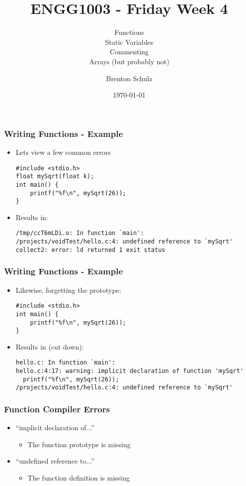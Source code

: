 \documentclass[14pt]{beamer}
\title{ENGG1003 - Friday Week 4}
\subtitle{Functions\\Static Variables\\Commenting\\Arrays (but probably not)}
\author{Brenton Schulz}
\institute{University of Newcastle}
\date{\today}
\begin{document}
\titlepage

\begin{frame}[fragile]
\frametitle{Writing Functions - Example}

\begin{itemize}
\item Lets view a few common errors
\begin{lstlisting}[style=CStyle]
#include <stdio.h>
float mySqrt(float k);
int main() {
	printf("%f\n", mySqrt(26));
}
\end{lstlisting}
\item Results in:
\begin{lstlisting}[style=pseudo]
/tmp/ccT6mLDi.o: In function `main':
/projects/voidTest/hello.c:4: undefined reference to `mySqrt'
collect2: error: ld returned 1 exit status
\end{lstlisting}
\end{itemize}
\end{frame}

\begin{frame}[fragile]
\frametitle{Writing Functions - Example}
\begin{itemize}
\item Likewise, forgetting the prototype:
\begin{lstlisting}[style=CStyle]
#include <stdio.h>
int main() {
	printf("%f\n", mySqrt(26));
}
\end{lstlisting}
\item Results in (cut down):
\begin{lstlisting}[style=pseudo]
hello.c: In function `main':
hello.c:4:17: warning: implicit declaration of function 'mySqrt'
  printf("%f\n", mySqrt(26));
/projects/voidTest/hello.c:4: undefined reference to `mySqrt'

\end{lstlisting}
\end{itemize}
\end{frame}

\begin{frame}
\frametitle{Function Compiler Errors}
\begin{itemize}
\item ``implicit declaration of...''
	\begin{itemize}
		\item The function prototype is missing
	\end{itemize}
\item ``undefined reference to...''
	\begin{itemize}
		\item The function definition is missing
	\end{itemize}
\end{itemize}
\end{frame}
\end{document}

